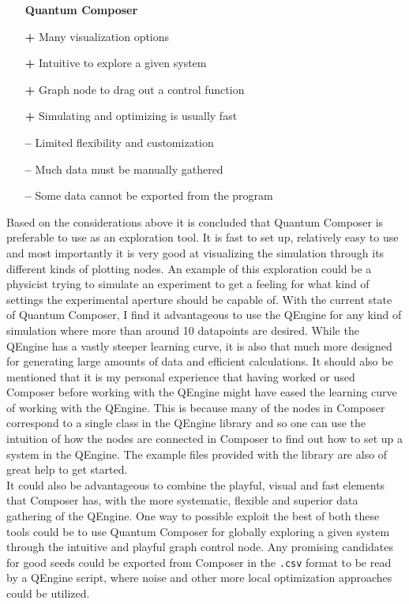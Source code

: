 \documentclass[a4paper, twocolumn]{revtex4-1}
\begin{document}
\begin{itemize}
	\item[] \textbf{Quantum Composer} 
	\item[\bf+] Many visualization options
	\item[\bf+] Intuitive to explore a given system
	\item[\bf+] Graph node to drag out a control function
	\item[\bf+] Simulating and optimizing is usually fast
	\item[\bf{--}] Limited flexibility and customization
	\item[\bf{--}] Much data must be manually gathered
	\item[\bf{--}] Some data cannot be exported from the program
\end{itemize}

Based on the considerations above it is concluded that Quantum Composer is preferable to use as an exploration tool. It is fast to set up, relatively easy to use and most importantly it is very good at visualizing the simulation through its different kinds of plotting nodes. An example of this exploration could be a physicist trying to simulate an experiment to get a feeling for what kind of settings the experimental aperture should be capable of. With the current state of Quantum Composer, I find it advantageous to use the QEngine for any kind of simulation where more than around 10 datapoints are desired. While the QEngine has a vastly steeper learning curve, it is also that much more designed for generating large amounts of data and efficient calculations. It should also be mentioned that it is my personal experience that having worked or used Composer before working with the QEngine might have eased the learning curve of working with the QEngine. This is because many of the nodes in Composer correspond to a single class in the QEngine library and so one can use the intuition of how the nodes are connected in Composer to find out how to set up a system in the QEngine. The example files provided with the library are also of great help to get started.\\

It could also be advantageous to combine the playful, visual and fast elements that Composer has, with the more systematic, flexible and superior data gathering of the QEngine. One way to possible exploit the best of both these tools could be to use Quantum Composer for globally exploring a given system through the intuitive and playful graph control node. Any promising candidates for good seeds could be exported from Composer in the \texttt{.csv} format to be read by a QEngine script, where noise and other more local optimization approaches could be utilized.
\end{document}

